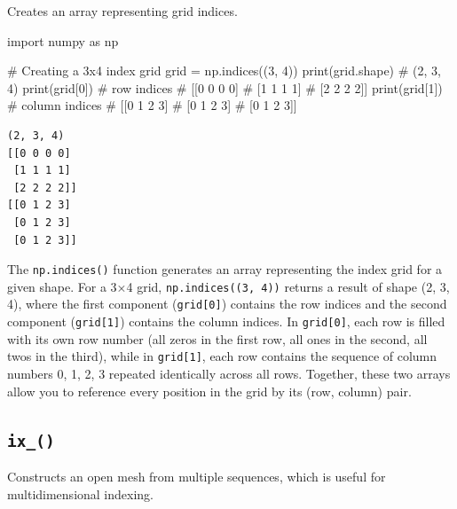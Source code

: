 \documentclass[
  english,
  letterpaper,
  DIV=11,
  numbers=noendperiod]{scrreprt}
\newenvironment{Shaded}{\begin{snugshade}}{\end{snugshade}}
\newcommand{\BuiltInTok}[1]{\textcolor[rgb]{0.00,0.23,0.31}{#1}}
\newcommand{\CommentTok}[1]{\textcolor[rgb]{0.37,0.37,0.37}{#1}}
\newcommand{\DecValTok}[1]{\textcolor[rgb]{0.68,0.00,0.00}{#1}}
\newcommand{\ImportTok}[1]{\textcolor[rgb]{0.00,0.46,0.62}{#1}}
\newcommand{\NormalTok}[1]{\textcolor[rgb]{0.00,0.23,0.31}{#1}}
\newcommand{\OperatorTok}[1]{\textcolor[rgb]{0.37,0.37,0.37}{#1}}
\begin{document}
Creates an array representing grid indices.

\begin{Shaded}
\begin{Highlighting}[]
\ImportTok{import}\NormalTok{ numpy }\ImportTok{as}\NormalTok{ np}

\CommentTok{\# Creating a 3x4 index grid}
\NormalTok{grid }\OperatorTok{=}\NormalTok{ np.indices((}\DecValTok{3}\NormalTok{, }\DecValTok{4}\NormalTok{))}
\BuiltInTok{print}\NormalTok{(grid.shape)  }\CommentTok{\# (2, 3, 4)}
\BuiltInTok{print}\NormalTok{(grid[}\DecValTok{0}\NormalTok{])  }\CommentTok{\# row indices}
\CommentTok{\# [[0 0 0 0]}
\CommentTok{\#  [1 1 1 1]}
\CommentTok{\#  [2 2 2 2]]}
\BuiltInTok{print}\NormalTok{(grid[}\DecValTok{1}\NormalTok{])  }\CommentTok{\# column indices}
\CommentTok{\# [[0 1 2 3]}
\CommentTok{\#  [0 1 2 3]}
\CommentTok{\#  [0 1 2 3]]}
\end{Highlighting}
\end{Shaded}

\begin{verbatim}
(2, 3, 4)
[[0 0 0 0]
 [1 1 1 1]
 [2 2 2 2]]
[[0 1 2 3]
 [0 1 2 3]
 [0 1 2 3]]
\end{verbatim}

The \texttt{np.indices()} function generates an array representing the
index grid for a given shape. For a 3×4 grid,
\texttt{np.indices((3,\ 4))} returns a result of shape (2, 3, 4), where
the first component (\texttt{grid{[}0{]}}) contains the row indices and
the second component (\texttt{grid{[}1{]}}) contains the column indices.
In \texttt{grid{[}0{]}}, each row is filled with its own row number (all
zeros in the first row, all ones in the second, all twos in the third),
while in \texttt{grid{[}1{]}}, each row contains the sequence of column
numbers 0, 1, 2, 3 repeated identically across all rows. Together, these
two arrays allow you to reference every position in the grid by its
(row, column) pair.

\subsection{\texorpdfstring{\texttt{ix\_()}}{ix\_()}}\label{ix_}

Constructs an open mesh from multiple sequences, which is useful for
multidimensional indexing.
\end{document}
